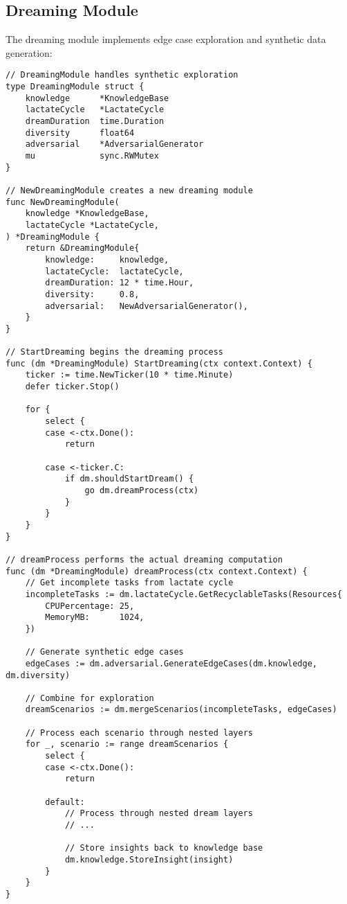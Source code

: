 \documentclass[11pt,a4paper,twocolumn]{article}
\begin{document}
\subsection{Dreaming Module}
The dreaming module implements edge case exploration and synthetic data generation:

\begin{lstlisting}[caption={Dreaming Module Implementation}, label={lst:dreaming}]
// DreamingModule handles synthetic exploration
type DreamingModule struct {
    knowledge      *KnowledgeBase
    lactateCycle   *LactateCycle
    dreamDuration  time.Duration
    diversity      float64
    adversarial    *AdversarialGenerator
    mu             sync.RWMutex
}

// NewDreamingModule creates a new dreaming module
func NewDreamingModule(
    knowledge *KnowledgeBase,
    lactateCycle *LactateCycle,
) *DreamingModule {
    return &DreamingModule{
        knowledge:     knowledge,
        lactateCycle:  lactateCycle,
        dreamDuration: 12 * time.Hour,
        diversity:     0.8,
        adversarial:   NewAdversarialGenerator(),
    }
}

// StartDreaming begins the dreaming process
func (dm *DreamingModule) StartDreaming(ctx context.Context) {
    ticker := time.NewTicker(10 * time.Minute)
    defer ticker.Stop()
    
    for {
        select {
        case <-ctx.Done():
            return
            
        case <-ticker.C:
            if dm.shouldStartDream() {
                go dm.dreamProcess(ctx)
            }
        }
    }
}

// dreamProcess performs the actual dreaming computation
func (dm *DreamingModule) dreamProcess(ctx context.Context) {
    // Get incomplete tasks from lactate cycle
    incompleteTasks := dm.lactateCycle.GetRecyclableTasks(Resources{
        CPUPercentage: 25,
        MemoryMB:      1024,
    })
    
    // Generate synthetic edge cases
    edgeCases := dm.adversarial.GenerateEdgeCases(dm.knowledge, dm.diversity)
    
    // Combine for exploration
    dreamScenarios := dm.mergeScenarios(incompleteTasks, edgeCases)
    
    // Process each scenario through nested layers
    for _, scenario := range dreamScenarios {
        select {
        case <-ctx.Done():
            return
            
        default:
            // Process through nested dream layers
            // ...
            
            // Store insights back to knowledge base
            dm.knowledge.StoreInsight(insight)
        }
    }
}
\end{lstlisting}
\end{document}
